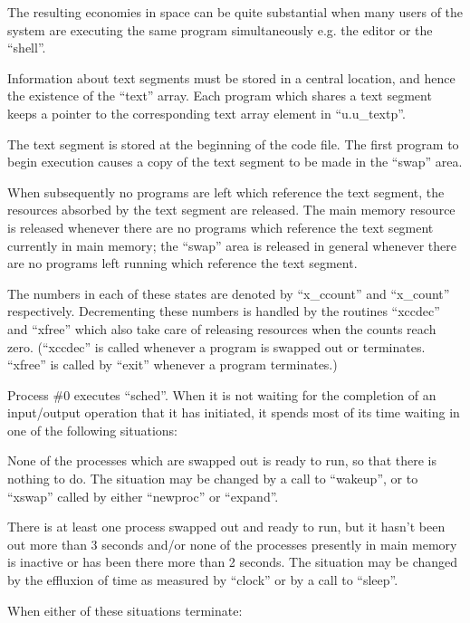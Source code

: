 The resulting economies in space can be
quite substantial when many users of
the system are executing the same program simultaneously e.g. the editor or
the ``shell''.

Information about text segments must be
stored in a central location, and hence
the existence of the ``text'' array. Each
program which shares a text segment
keeps a pointer to the corresponding
text array element in ``u.u\_textp''.

The text segment is stored at the
beginning of the code file. The first
program to begin execution causes a
copy of the text segment to be made in
the ``swap'' area.

When subsequently no programs are left
which reference the text segment, the
resources absorbed by the text segment
are released. The main memory resource
is released whenever there are no programs which reference the text segment
currently in main memory; the ``swap''
area is released in general whenever
there are no programs left running
which reference the text segment.


The numbers in each of these states are
denoted by ``x\_ccount'' and ``x\_count''
respectively. Decrementing these
numbers is handled by the routines
``xccdec'' and ``xfree'' which also take
care of releasing resources when the
counts reach zero. (``xccdec'' is called
whenever a program is swapped out or
terminates. ``xfree'' is called by ``exit''
whenever a program terminates.)


Process \#0 executes ``sched''. When it is
not waiting for the completion of an
input/output operation that it has initiated, it spends most of its time
waiting in one of the following situations:

\bd
 \item[A. (runout)]
 None of the processes which are
 swap\-ped out is ready to run, so
 that there is nothing to do. The
 situation may be changed by a call
 to ``wakeup'', or to ``xswap'' called
 by either ``newproc'' or ``expand''.

 \item[B. (runin)]
 There is at least one process
 swapped out and ready to run, but
 it hasn't been out more than 3
 seconds and/or none of the
 processes presently in main memory
 is inactive or has been there more
 than 2 seconds. The situation may
be changed by the effluxion of
time as measured by ``clock'' or by
a call to ``sleep''.
\ed

\noindent When either of these situations terminate:


